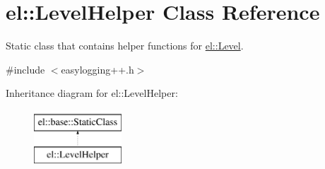 \hypertarget{classel_1_1LevelHelper}{\section{el\-:\-:Level\-Helper Class Reference}
\label{classel_1_1LevelHelper}
}


Static class that contains helper functions for \hyperlink{namespaceel_ab0ac6091262344c52dd2d3ad099e8e36}{el\-::\-Level}.  




{\ttfamily \#include $<$easylogging++.\-h$>$}

Inheritance diagram for el\-:\-:Level\-Helper\-:\begin{figure}[H]
\begin{center}
\leavevmode
\includegraphics[height=2.000000cm]{classel_1_1LevelHelper}
\end{center}
\end{figure}
